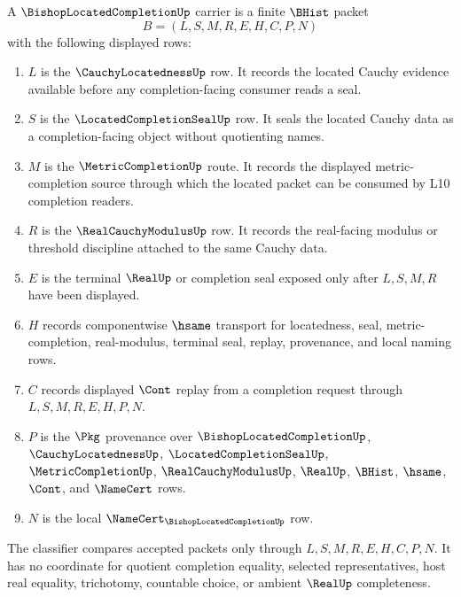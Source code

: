 \begin{definition}
\label{def:bishop-located-completion-carrier}
A $\BishopLocatedCompletionUp$ carrier is a finite $\BHist$ packet
$$
B=(L,S,M,R,E,H,C,P,N)
$$
with the following displayed rows:
\begin{enumerate}
\item $L$ is the $\CauchyLocatednessUp$ row. It records the located Cauchy evidence available before any completion-facing consumer reads a seal.
\item $S$ is the $\LocatedCompletionSealUp$ row. It seals the located Cauchy data as a completion-facing object without quotienting names.
\item $M$ is the $\MetricCompletionUp$ route. It records the displayed metric-completion source through which the located packet can be consumed by L10 completion readers.
\item $R$ is the $\RealCauchyModulusUp$ row. It records the real-facing modulus or threshold discipline attached to the same Cauchy data.
\item $E$ is the terminal $\RealUp$ or completion seal exposed only after $L,S,M,R$ have been displayed.
\item $H$ records componentwise $\hsame$ transport for locatedness, seal, metric-completion, real-modulus, terminal seal, replay, provenance, and local naming rows.
\item $C$ records displayed $\Cont$ replay from a completion request through $L,S,M,R,E,H,P,N$.
\item $P$ is the $\Pkg$ provenance over $\BishopLocatedCompletionUp$, $\CauchyLocatednessUp$, $\LocatedCompletionSealUp$, $\MetricCompletionUp$, $\RealCauchyModulusUp$, $\RealUp$, $\BHist$, $\hsame$, $\Cont$, and $\NameCert$ rows.
\item $N$ is the local $\NameCert_{\BishopLocatedCompletionUp}$ row.
\end{enumerate}
The classifier compares accepted packets only through $L,S,M,R,E,H,C,P,N$. It has no coordinate for quotient completion equality, selected representatives, host real equality, trichotomy, countable choice, or ambient $\RealUp$ completeness.
\end{definition}

